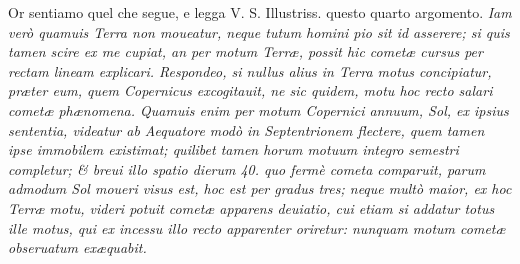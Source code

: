 \documentclass[11pt,twoside,openany]{book}
\begin{document}
\par\bigskip\noindent{}\enspace Or sentiamo quel che segue, e legga V. S. Illustriss. questo quarto argomento. \textit{Iam verò quamuis Terra non moueatur, neque tutum homini pio sit id asserere; si quis tamen scire ex me cupiat, an per motum Terræ, possit hic cometæ cursus per rectam lineam explicari. Respondeo, si nullus alius in Terra motus concipiatur, præter eum, quem Copernicus excogitauit, ne sic quidem, motu hoc recto salari cometæ phænomena. Quamuis enim per motum Copernici annuum, Sol, ex ipsius sententia, videatur ab Aequatore modò in Septentrionem flectere, quem tamen ipse immobilem existimat; quilibet tamen horum motuum integro }\textit{semestri completur; \& breui illo spatio dierum 40. quo fermè cometa comparuit, parum admodum Sol moueri visus est, hoc est per gradus tres; neque multò maior, ex hoc Terræ motu, videri potuit cometæ apparens deuiatio, cui etiam si addatur totus ille motus, qui ex incessu illo recto apparenter oriretur: nunquam motum cometæ obseruatum exæquabit.}
\end{document}

